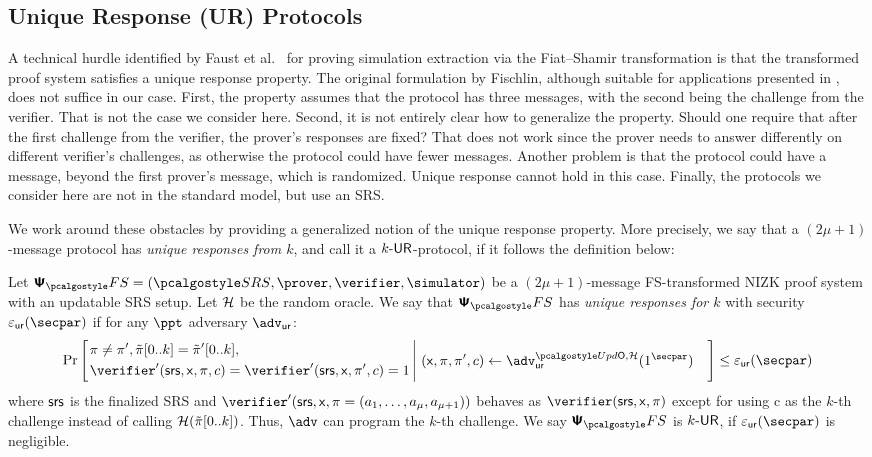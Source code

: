 \subsection{Unique Response (UR) Protocols}
A technical hurdle identified by Faust et al.~\cite{INDOCRYPT:FKMV12} for proving
simulation extraction via the Fiat--Shamir transformation is that the transformed
proof system satisfies a unique response property. The original formulation by Fischlin, although suitable for applications presented in
\cite{C:Fischlin05,INDOCRYPT:FKMV12}, does not suffice in our case. First, the
property assumes that the protocol has three messages, with the second being the
challenge from the verifier. That is not the case we consider here. Second, it is not
entirely clear how to generalize the property. Should one require that after the
first challenge from the verifier, the prover's responses are fixed?  That does not
work since the prover needs to answer differently on different verifier's challenges,
as otherwise the protocol could have fewer messages.  Another problem is that the
protocol could have a message, beyond the first prover's message, which is
randomized. Unique response cannot hold in this case. Finally, the protocols we
consider here are not in the standard model, but use an SRS.

We work around these obstacles by providing a generalized notion of the unique
response property. More precisely, we say that a $(2\mu + 1)$-message protocol
has \emph{unique responses from $k$}, and call it a ${k\text{-}\mathsf{UR}}$-protocol, if it
follows the definition below:

\begin{definition}
Let $\psfs = (\SRScer, \prover, \verifier, \simulator)$ be a $(2\mu + 1)$-message FS-transformed NIZK proof system with an updatable SRS setup. Let $\mathcal{H}$ be the random oracle. 
We say that $\psfs$ has \emph{unique responses for $k$} with security $\epsur(\secpar)$ if for any $\ppt$ adversary $\advur$:
  \[
	\Pr\left[
		\left.
	\begin{aligned}
	& \zkproof \neq \zkproof', \tzkproof[0..k] = \tzkproof'[0..k],  \\
	& \verifier' (\srs, \inp, \zkproof,c) =
	\verifier' (\srs, \inp, \zkproof',c) = 1  \\
	\end{aligned}
	\,\right|\,
	\begin{aligned}
		& (\inp, \zkproof, \zkproof', c) \gets \advur^{\initU,\ro}(1^\secpar) 
	\end{aligned}
	\right] \leq \epsur(\secpar) 
	\]
	where $\mathsf{srs}$ is the finalized SRS and $\verifier'(\srs,\inp,\zkproof=(a_1, \dots, a_\mu,a_{\mu+1}))$ behaves as $\verifier (\srs, \inp, \zkproof)$ except for using c as the $k$-th challenge instead of calling $\mathcal{H}(\tilde{\pi}[0..k]) $. Thus, $\adv$ can program the $k$-th challenge. 
	We say $\psfs$  is ${k\text{-}\mathsf{UR}}$, if $\epsur(\secpar)$ is negligible.
\end{definition}

